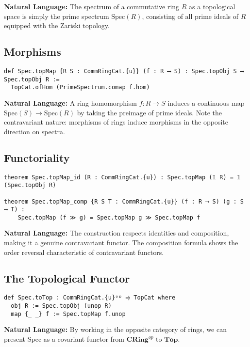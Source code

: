 \documentclass{article}
\theoremstyle{definition}
\begin{document}
\textbf{Natural Language:} The spectrum of a commutative ring $R$ as a topological space is simply the prime spectrum $\mathrm{Spec}(R)$, consisting of all prime ideals of $R$ equipped with the Zariski topology.

\subsection{Morphisms}

\begin{lstlisting}
def Spec.topMap {R S : CommRingCat.{u}} (f : R ⟶ S) : Spec.topObj S ⟶ Spec.topObj R :=
  TopCat.ofHom (PrimeSpectrum.comap f.hom)
\end{lstlisting}

\textbf{Natural Language:} A ring homomorphism $f: R \to S$ induces a continuous map $\mathrm{Spec}(S) \to \mathrm{Spec}(R)$ by taking the preimage of prime ideals. Note the contravariant nature: morphisms of rings induce morphisms in the opposite direction on spectra.

\subsection{Functoriality}

\begin{lstlisting}
theorem Spec.topMap_id (R : CommRingCat.{u}) : Spec.topMap (𝟙 R) = 𝟙 (Spec.topObj R)

theorem Spec.topMap_comp {R S T : CommRingCat.{u}} (f : R ⟶ S) (g : S ⟶ T) :
    Spec.topMap (f ≫ g) = Spec.topMap g ≫ Spec.topMap f
\end{lstlisting}

\textbf{Natural Language:} The construction respects identities and composition, making it a genuine contravariant functor. The composition formula shows the order reversal characteristic of contravariant functors.

\subsection{The Topological Functor}

\begin{lstlisting}
def Spec.toTop : CommRingCat.{u}ᵒᵖ ⥤ TopCat where
  obj R := Spec.topObj (unop R)
  map {_ _} f := Spec.topMap f.unop
\end{lstlisting}

\textbf{Natural Language:} By working in the opposite category of rings, we can present Spec as a covariant functor from $\mathbf{CRing}^{op}$ to $\mathbf{Top}$.
\end{document}
